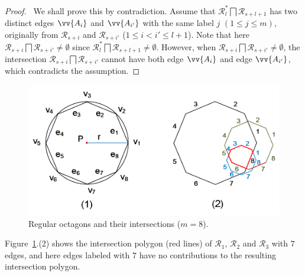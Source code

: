 

\begin{proof}\
We shall prove this by contradiction.
Assume that $\mathcal{R}^*_{l} \bigsqcap \mathcal{R}_{s+l+1}$ has two distinct edges $\vv{A_i}$ and $\vv{A_{i'}}$  with the same label $j$ $(1\le j \le m)$, originally from
$\mathcal{R}_{s+i}$ and $\mathcal{R}_{s+i'}$  ($1\le i< i' \le l+1$).
%
Note that here $\mathcal{R}_{s+i} \bigsqcap \mathcal{R}_{s+i'} \ne \emptyset$ since $\mathcal{R}^*_l \bigsqcap \mathcal{R}_{s+l+1} \ne \emptyset$.
%
However, when $\mathcal{R}_{s+i} \bigsqcap \mathcal{R}_{s+i'} \ne \emptyset$, the intersection $\mathcal{R}_{s+i} \bigsqcap \mathcal{R}_{s+i'}$ cannot have
both edge $\vv{A_i}$ and edge $\vv{A_{i'}}$, which contradicts the assumption. \eop
\end{proof}


\begin{figure}[tb!]
	\centering
	\includegraphics[scale=0.85]{figures/Fig-polygons.png}
	\vspace{0ex}
	\caption{\small Regular octagons and their intersections ($m =8$).}
	\vspace{-1ex}
	\label{fig:polygons}
\end{figure}

Figure~\ref{fig:polygons}.(2) shows the intersection polygon (red lines) of $\mathcal{R}_1$, $\mathcal{R}_2$ and $\mathcal{R}_3$ with $7$ edges, and here edges labeled with $7$ have no contributions to the resulting intersection polygon.

